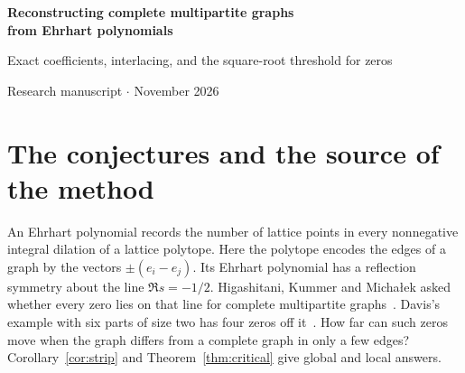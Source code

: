 \documentclass[11pt,letterpaper]{article}
\theoremstyle{remark}\newtheorem{remark}[theorem]{Remark}
\begin{document}
\thispagestyle{plain}
\begin{center}
{\LARGE\bfseries Reconstructing complete multipartite graphs\\[4pt] from Ehrhart polynomials\par}
\vspace{0.5em}
{\large Exact coefficients, interlacing, and the square-root threshold for zeros\par}
\vspace{0.7em}
{\small Research manuscript \enspace$\cdot$ November 2026}
\end{center}

\begin{abstract}
The Ehrhart polynomial of the symmetric edge polytope of a connected complete
multipartite graph determines the graph. We prove this by counting subsets
of $v-1$ vertices obtained by identifying a pair from different parts.
The formula gives nonnegative gamma coefficients and exact cross-degree
$\min(\lfloor(v-1)/2\rfloor,v-1-b)$, where $b$ is the largest part.
It resolves the cross-degree question in K\"olbl's Conjecture~4.8 and
gives strict interlacing for $K_{1^k,n}$ and $K_{1^{k+1},n}$ for
$1\le k\le20$ and all $n\ge1$.

For $K_{d+1}$ with a matching deleted, the possible finite limits of Ehrhart
zeros fill precisely $-1\le\Re s\le0$. We determine the counts on the
three limiting lines for a matching of order $d^\alpha$, $1/2<\alpha\le1$.
At the scale $M\sim c\sqrt d$ the sharp constant for bounded-region
stability over both parities is $c=\sqrt{8/\pi}$. The numerator of the
Ehrhart series loses real-rootedness at a different threshold, of order
$d^{3/4}$. A maximum matching yields asymptotically
$(\sqrt{2}/\pi)\sqrt{d\log d}$ nonreal numerator zeros.
The arguments are independent of Dirichlet GRH.
\end{abstract}

\section{The conjectures and the source of the method}
An Ehrhart polynomial records the number of lattice points in every
nonnegative integral dilation of a lattice polytope. Here the polytope
encodes the edges of a graph by the vectors $\pm(e_i-e_j)$. Its Ehrhart
polynomial has a reflection symmetry about the line $\Re s=-1/2$.
Higashitani, Kummer and Micha\l ek asked whether every zero lies on that
line for complete multipartite graphs~\cite[Conj.~4.10]{hkm}. Davis's
example with six parts of size two has four zeros off it~\cite{davis}.
How far can such zeros move when the graph differs from a complete
graph in only a few edges? Corollary~\ref{cor:strip} and
Theorem~\ref{thm:critical} give global and local answers.
\end{document}
